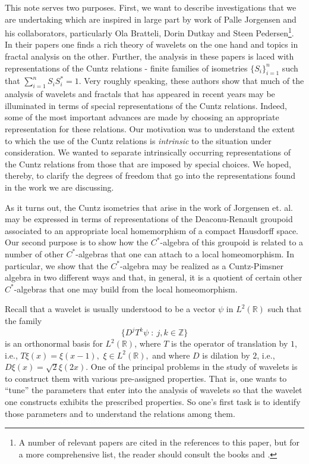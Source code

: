 \documentclass{amsproc}
\theoremstyle{plain}
\theoremstyle{definition}
\theoremstyle{definition}
\theoremstyle{remark}
\theoremstyle{plain}
\begin{document}
This note serves two purposes. First, we want to describe investigations
that we are undertaking which are inspired in large part by work of
Palle Jorgensen and his collaborators, particularly Ola Bratteli,
Dorin Dutkay and Steen Pedersen\footnote{A number of relevant papers are cited in the references to this paper,
but for a more comprehensive list, the reader should consult the books
\cite{BJ02} and \cite{pJ06}.}. In their papers one finds a rich theory of wavelets on the one hand
and topics in fractal analysis on the other. Further, the analysis
in these papers is laced with representations of the Cuntz relations
- finite families of isometries $\{ S_{i}\}_{i=1}^{n}$ such that
$\sum_{i=1}^{n}S_{i}S_{i}^{*}=1$. Very roughly speaking, these authors
show that much of the analysis of wavelets and fractals that has appeared
in recent years may be illuminated in terms of special representations
of the Cuntz relations. Indeed, some of the most important advances
are made by choosing an appropriate representation for these relations.
Our motivation was to understand the extent to which the use of the
Cuntz relations is \emph{intrinsic} to the situation under consideration.
We wanted to separate intrinsically occurring representations of the
Cuntz relations from those that are imposed by special choices. We
hoped, thereby, to clarify the degrees of freedom that go into the
representations found in the work we are discussing.

As it turns out, the Cuntz isometries that arise in the work of Jorgensen
et. al. may be expressed in terms of representations of the Deaconu-Renault
groupoid associated to an appropriate local homemorphism of a compact
Hausdorff space. Our second purpose is to show how the $C^{*}$-algebra
of this groupoid is related to a number of other $C^{*}$-algebras
that one can attach to a local homeomorphism. In particular, we show
that the $C^{*}$-algebra may be realized as a Cuntz-Pimsner algebra
in two different ways and that, in general, it is a quotient of certain
other $C^{*}$-algebras that one may build from the local homeomorphism.

Recall that a wavelet is usually understood to be a vector $\psi$
in $L^{2}(\mathbb{R})$ such that the family \[
\{ D^{j}T^{k}\psi\;:\: j,k\in\mathbb{Z}\}\]
is an orthonormal basis for $L^{2}(\mathbb{R})$, where $T$ is the
operator of translation by $1$, i.e., $T\xi(x)=\xi(x-1),$ $\xi\in
L^{2}(\mathbb{R}),$
and where $D$ is dilation by $2$, i.e., $D\xi(x)=\sqrt{2}\xi(2x)$.
One of the principal problems in the study of wavelets is to construct
them with various pre-assigned properties. That is, one wants to {}``tune''
the parameters that enter into the analysis of wavelets so that the
wavelet one constructs exhibits the prescribed properties. So one's
first task is to identify those parameters and to understand the relations
among them.
\end{document}
